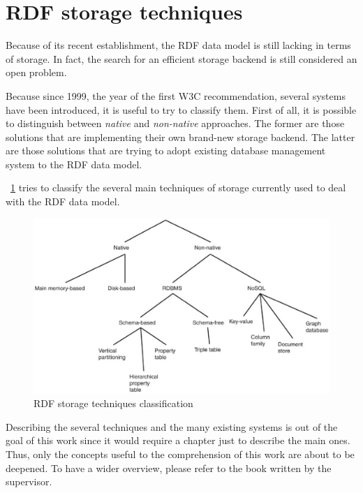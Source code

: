 \documentclass[10pt, a4paper]{report}
\begin{document}
\section{RDF storage techniques}

Because of its recent establishment, the RDF data model is still lacking in terms of storage. In fact, the search for an efficient storage backend is still considered an open problem.

Because since 1999, the year of the first W3C recommendation, several systems have been introduced, it is useful to try to classify them. First of all, it is possible to distinguish between \textit{native} and \textit{non-native} approaches. The former are those solutions that are implementing their own brand-new storage backend. The latter are those solutions that are trying to adopt existing database management system to the RDF data model.

\figurename~\ref{fig:rdf_storage_classification} tries to classify the several main techniques of storage currently used to deal with the RDF data model.

\begin{figure}
	\centering
	\includegraphics[width=12cm]{./assets/img/rdf_storage_classification.jpg}
	\caption{RDF storage techniques classification}
	\label{fig:rdf_storage_classification}
	\vspace{0.5cm}
\end{figure}

Describing the several techniques and the many existing systems is out of the goal of this work since it would require a chapter just to describe the main ones. Thus, only the concepts useful to the comprehension of this work are about to be deepened. To have a wider overview, please refer to the book written by the supervisor\cite{rdf_database_system}.
\end{document}
